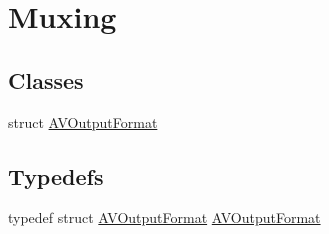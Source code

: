 \hypertarget{group__lavf__encoding}{}\section{Muxing}
\label{group__lavf__encoding}
\subsection*{Classes}
\begin{DoxyCompactItemize}
\item 
struct \hyperlink{struct_a_v_output_format}{A\+V\+Output\+Format}
\end{DoxyCompactItemize}
\subsection*{Typedefs}
\begin{DoxyCompactItemize}
\item 
typedef struct \hyperlink{struct_a_v_output_format}{A\+V\+Output\+Format} \hyperlink{group__lavf__encoding_ga7328f2fe9ea40f836f0eea2d44f2db5e}{A\+V\+Output\+Format}
\end{DoxyCompactItemize}

